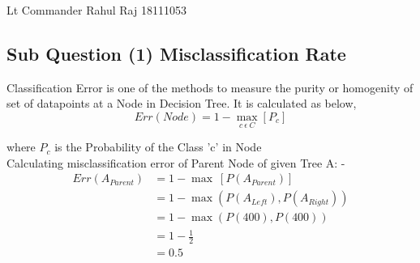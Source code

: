 \documentclass[a4paper,11pt]{article}
\newcommand\tab[1][1cm]{\hspace*{#1}}
\begin{document}
{Lt Commander Rahul Raj}   %
{18111053}	%

\begin{mlsolution}
\section{Sub Question (1)  Misclassification Rate	}
\tab Classification Error is one of the methods to measure the purity or homogenity of set of datapoints at a Node in Decision Tree. It is calculated as below,
$$Err(Node) = 1 - \max\limits_{c\  \epsilon\  C} [P_c] $$

\tab \tab \tab where $P_c$ is the Probability of the Class 'c' in Node\\

\noindent
\tab Calculating misclassification error of Parent Node of given Tree A: -
\begin{align*}
  Err(A_{Parent}) &= 1 - \max\ [P(A_{Parent})]\\
  &= 1 - \max(P(A_{Left}),P(A_{Right}))\\
  &= 1 - \max(P(400),P(400))\\
  &= 1 - \frac{1}{2}\\
  &= 0.5
\end{align*}


\end{mlsolution}
\end{document}
